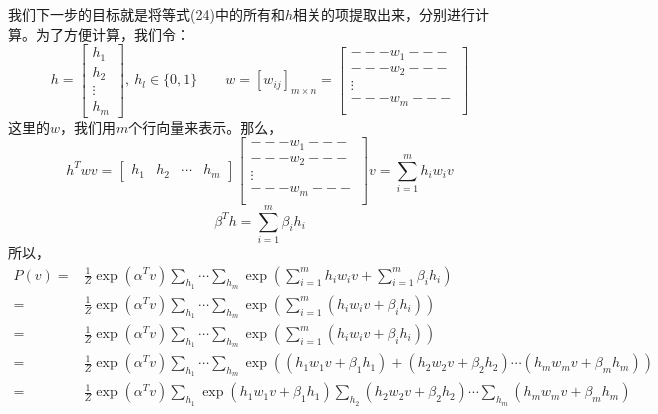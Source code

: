 \documentclass[a4paper]{article}
\begin{document}
我们下一步的目标就是将等式(24)中的所有和$h$相关的项提取出来，分别进行计算。为了方便计算，我们令：
\begin{equation}
    h = 
   \begin{bmatrix}
    h_1 \\
    h_2\\
    \vdots \\ 
    h_m
    \end{bmatrix}, \ h_l\in\{0,1\}\qquad
    w=[w_{ij}]_{m\times n} = 
    \begin{bmatrix}
    ---w_1---\\
    ---w_2---\\
    \vdots \\
    ---w_m---\\
    \end{bmatrix}
\end{equation}
这里的$w$，我们用$m$个行向量来表示。那么，
$$
h^T w v = \begin{bmatrix}
    h_1 & h_2 & \cdots & h_m
    \end{bmatrix}
    \begin{bmatrix}
    ---w_1---\\
    ---w_2---\\
    \vdots \\
    ---w_m---\\
    \end{bmatrix}v = \sum_{i=1}^m h_iw_iv
$$
$$
\beta^Th = \sum_{i=1}^m \beta_i h_i
$$
所以，
\begin{equation}
    \begin{split}
        P(v) = & \frac{1}{Z} \exp(\alpha^T v) \sum_{h_1}\cdots \sum_{h_m} \exp \left(\sum_{i=1}^m h_iw_iv + \sum_{i=1}^m \beta_i h_i\right)\\
        = & \frac{1}{Z} \exp(\alpha^T v) \sum_{h_1}\cdots \sum_{h_m} \exp \left(\sum_{i=1}^m (h_iw_iv + \beta_i h_i)\right)\\
        = & \frac{1}{Z} \exp(\alpha^T v) \sum_{h_1}\cdots \sum_{h_m} \exp \left(\sum_{i=1}^m (h_iw_iv + \beta_i h_i)\right)\\
        = & \frac{1}{Z} \exp(\alpha^T v) \sum_{h_1}\cdots \sum_{h_m} \exp \left((h_1w_1v + \beta_1 h_1)+(h_2w_2v + \beta_2 h_2)\cdots (h_mw_mv + \beta_m h_m)\right)\\
        = & \frac{1}{Z} \exp(\alpha^T v) \sum_{h_1}\exp (h_1w_1v + \beta_1 h_1) \sum_{h_2}(h_2w_2v + \beta_2 h_2) \cdots \sum_{h_m}(h_mw_mv + \beta_m h_m)
    \end{split}
\end{equation}
\end{document}
